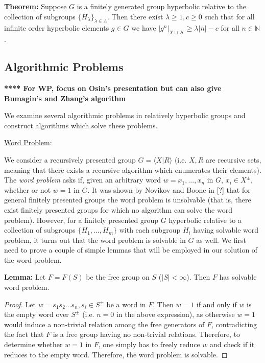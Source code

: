 \documentclass[12pt]{article}
\newcommand{\vs}{\vskip10pt}
\begin{document}
	\vs 
	
	\textbf{Theorem: } Suppose $G$ is a finitely generated group hyperbolic relative to the collection of subgroups $\{H_{\lambda}\}_{\lambda \in \Lambda}$. Then there exist $\lambda \geq 1, c \geq 0$ such that for all infinite order hyperbolic elements $g \in G$ we have $\vert g^n \vert_{X \cup \mathcal{H}} \geq \lambda \vert n \vert - c$ for all $n \in \mathbb{N}$.
	
		
	\subsection{Algorithmic Problems}
	
	\textbf{**** For WP, focus on Osin's presentation but can also give Bumagin's and Zhang's algorithm}
	
	We examine several algorithmic problems in relatively hyperbolic groups and construct algorithms which solve these problems. 
	
	\vs 
	
	\underline{Word Problem}: 
	
	\vs 
	
	We consider a recursively presented group $G = \langle X \vert R \rangle$ (i.e. $X,R$ are recursive sets, meaning that there exists a recursive algorithm which enumerates their elements). The \textit{word problem} asks if, given an arbitrary word $w = x_1,...,x_n$ in $G$, $x_i \in X^{\pm}$, whether or not $w = 1$ in $G$. It was shown by Novikov and Boone in [?] that for general finitely presented groups the word problem is unsolvable (that is, there exist finitely presented groups for which no algorithm can solve the word problem). However, for a finitely presented group $G$ hyperbolic relative to a collection of subgroups $\{H_1,...,H_m\}$ with each subgroup $H_i$ having solvable word problem, it turns out that the word problem is solvable in $G$ as well. We first need to prove a couple of simple lemmas that will be employed in our solution of the word problem. 
	
	\vs 
	
	\textbf{Lemma: } Let $F = F(S)$ be the free group on $S$ ($\vert S \vert < \infty$). Then $F$ has solvable word problem. 
	
	\begin{proof}
		
		Let $w = s_1 s_2 ... s_n, s_i \in S^{\pm}$ be a word in $F$. Then $w = 1$ if and only if $w$ is the empty word over $S^{\pm}$ (i.e. $n = 0$ in the above expression), as otherwise $w=1$ would induce a non-trivial relation among the free generators of $F$, contradicting the fact that $F$ is a free group having no non-trivial relations. Therefore, to determine whether $w=1$ in $F$, one simply has to freely reduce $w$ and check if it reduces to the empty word. Therefore, the word problem is solvable. 
		
	\end{proof}
	
\end{document}
